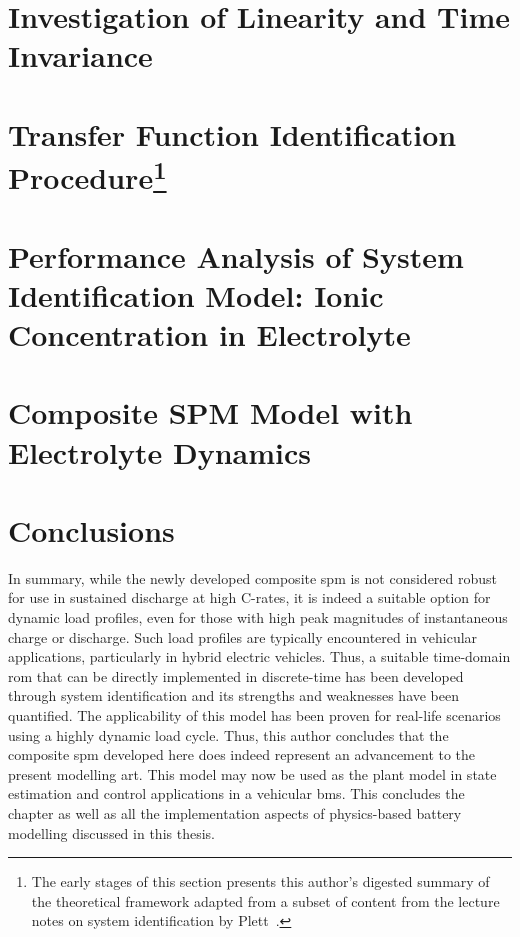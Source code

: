 \section{Investigation of Linearity and Time Invariance}\label{sec:lticheck}


\section[Transfer Function Identification Procedure]{Transfer Function Identification Procedure\footnote{The early stages of this section presents this author's digested summary of the theoretical framework adapted from a subset of content from the lecture notes on system identification by Plett~\cite{PlettECE5560_02,PlettECE5560_03,PlettECE5560_04}.}}\label{sec:actualsysid}


\section{Performance Analysis of System Identification Model: Ionic Concentration in Electrolyte}\label{sec:perfanalysisnewmodel}


\section{Composite SPM Model with Electrolyte Dynamics}


\section{Conclusions}
In  summary, while  the newly  developed composite  \gls{spm} is  not considered
robust for use in  sustained discharge at high C-rates, it  is indeed a suitable
option for  dynamic load profiles, even  for those with high  peak magnitudes of
instantaneous charge or discharge. Such  load profiles are typically encountered
in vehicular  applications, particularly  in hybrid  electric vehicles.  Thus, a
suitable time-domain \gls{rom} that can be directly implemented in discrete-time
has  been  developed  through  system   identification  and  its  strengths  and
weaknesses have been quantified. The applicability of this model has been proven
for real-life  scenarios using a  highly dynamic  load cycle. Thus,  this author
concludes that the  composite \gls{spm} developed here does  indeed represent an
advancement to  the present  modelling art. This  model may now  be used  as the
plant  model  in  state  estimation  and control  applications  in  a  vehicular
\gls{bms}. This concludes the chapter as  well as all the implementation aspects
of physics-based battery modelling discussed in this thesis.

